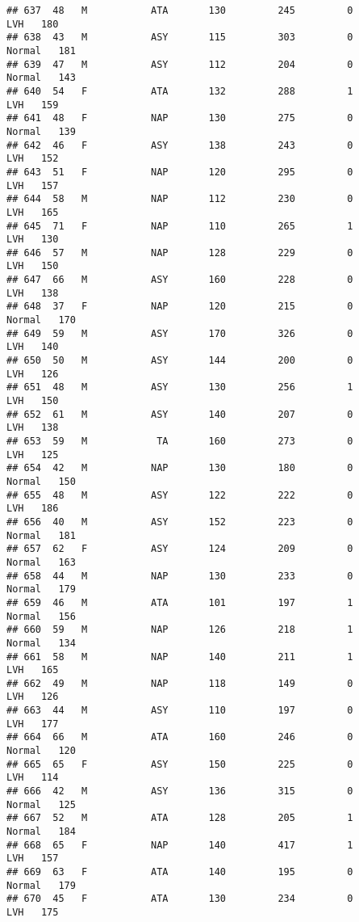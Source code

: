 \documentclass[
]{article}
\begin{document}
\begin{verbatim}
## 637  48   M           ATA       130         245         0        LVH   180
## 638  43   M           ASY       115         303         0     Normal   181
## 639  47   M           ASY       112         204         0     Normal   143
## 640  54   F           ATA       132         288         1        LVH   159
## 641  48   F           NAP       130         275         0     Normal   139
## 642  46   F           ASY       138         243         0        LVH   152
## 643  51   F           NAP       120         295         0        LVH   157
## 644  58   M           NAP       112         230         0        LVH   165
## 645  71   F           NAP       110         265         1        LVH   130
## 646  57   M           NAP       128         229         0        LVH   150
## 647  66   M           ASY       160         228         0        LVH   138
## 648  37   F           NAP       120         215         0     Normal   170
## 649  59   M           ASY       170         326         0        LVH   140
## 650  50   M           ASY       144         200         0        LVH   126
## 651  48   M           ASY       130         256         1        LVH   150
## 652  61   M           ASY       140         207         0        LVH   138
## 653  59   M            TA       160         273         0        LVH   125
## 654  42   M           NAP       130         180         0     Normal   150
## 655  48   M           ASY       122         222         0        LVH   186
## 656  40   M           ASY       152         223         0     Normal   181
## 657  62   F           ASY       124         209         0     Normal   163
## 658  44   M           NAP       130         233         0     Normal   179
## 659  46   M           ATA       101         197         1     Normal   156
## 660  59   M           NAP       126         218         1     Normal   134
## 661  58   M           NAP       140         211         1        LVH   165
## 662  49   M           NAP       118         149         0        LVH   126
## 663  44   M           ASY       110         197         0        LVH   177
## 664  66   M           ATA       160         246         0     Normal   120
## 665  65   F           ASY       150         225         0        LVH   114
## 666  42   M           ASY       136         315         0     Normal   125
## 667  52   M           ATA       128         205         1     Normal   184
## 668  65   F           NAP       140         417         1        LVH   157
## 669  63   F           ATA       140         195         0     Normal   179
## 670  45   F           ATA       130         234         0        LVH   175

\end{verbatim}
\end{document}
